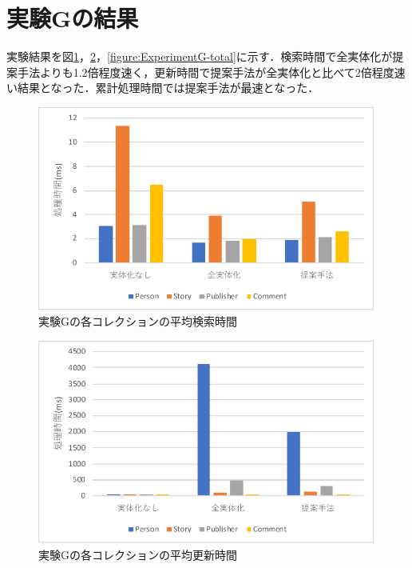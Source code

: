 \documentclass[a4paper,11pt]{ujreport}
\begin{document}
\section{実験Gの結果}
実験結果を図\ref{figure:ExperimentG-find}，\ref{figure:ExperimentG-update}，\ref{figure:ExperimentG-total}に示す．検索時間で全実体化が提案手法よりも1.2倍程度速く，更新時間で提案手法が全実体化と比べて2倍程度速い結果となった．累計処理時間では提案手法が最速となった．
\begin{figure}[htbp]
	\begin{center}
		\includegraphics[width=30em]{src/ExperimentG-find.pdf} %
	\end{center}
	\caption{実験Gの各コレクションの平均検索時間}
	\label{figure:ExperimentG-find}
\end{figure}
\begin{figure}[htbp]
	\begin{center}
		\includegraphics[width=30em]{src/ExperimentG-update.pdf} %
	\end{center}
	\caption{実験Gの各コレクションの平均更新時間}
	\label{figure:ExperimentG-update}
\end{figure}
\end{document}
